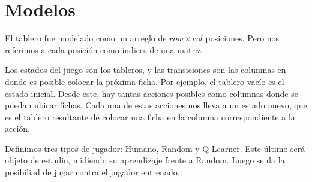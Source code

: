 \section{Modelos}

El tablero fue modelado como un arreglo de $row \times col$ posiciones. Pero nos referimos a cada posici\'on como \'indices de una matriz.

Los estados del juego son los tableros, y las transiciones son las columnas en donde es posible colocar la pr\'oxima ficha. Por ejemplo, el tablero vacío es el estado inicial. Desde este, hay tantas acciones posibles como columnas donde se puedan ubicar fichas. Cada una de estas acciones nos lleva a un estado nuevo, que es el tablero resultante de colocar una ficha en la columna correspondiente a la acción.

Definimos tres tipos de jugador: Humano, Random y Q-Learner. Este \'ultimo ser\'a objeto de estudio, midiendo su aprendizaje frente a Random. Luego se da la posibiliad de jugar contra el jugador entrenado.
